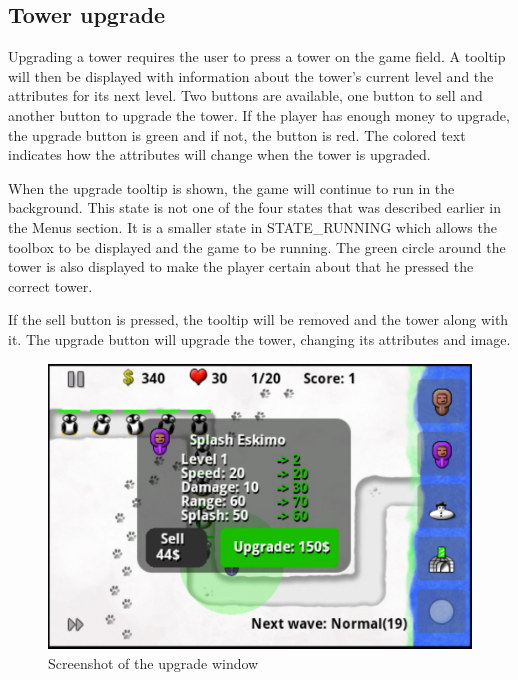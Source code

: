 \subsection{Tower upgrade}

Upgrading a tower requires the user to press a tower on the game field. A tooltip will then be displayed with information about the tower's current level and the attributes for its next level. Two buttons are available, one button to sell and another button to upgrade the tower. If the player has enough money to upgrade, the upgrade button is green and if not, the button is red. The colored text indicates how the attributes will change when the tower is upgraded.

When the upgrade tooltip is shown, the game will continue to run in the background. This state is not one of the four states that was described earlier in the Menus section. It is a smaller state in STATE\_RUNNING which allows the toolbox to be displayed and the game to be running. The green circle around the tower is also displayed to make the player certain about that he pressed the correct tower.  

If the sell button is pressed, the tooltip will be removed and the tower along with it. The upgrade button will upgrade the tower, changing its attributes and image.

\begin{figure}[here]
\begin{center}
\includegraphics[scale=0.6]{pics/chapters/chapter4/towerupgrade}
\end{center}
\caption{Screenshot of the upgrade window}
\label{fig:towerUpgrade}
\end{figure}

